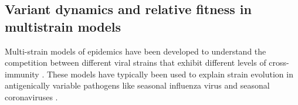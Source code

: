 \documentclass[11pt,oneside,letterpaper]{article}
\begin{document}
%



\subsection*{Variant dynamics and relative fitness in multistrain models}

Multi-strain models of epidemics have been developed to understand the competition between different viral strains that exhibit different levels of cross-immunity \cite{Gog2002, bedford2012canalization}.
These models have typically been used to explain strain evolution in antigenically variable pathogens like seasonal influenza virus \cite{bedford2014integrating} and seasonal coronaviruses \cite{Kistler2021, Eguia2021}.
\end{document}
